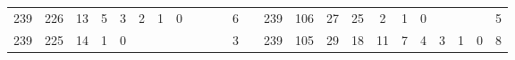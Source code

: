 {\begin{tabular}{cccccccccccclccccccccccc}
239                                                & 226                                                & 13                                               & 5                                                & 3                                                & 2                                                & 1                                               & 0                                               &                                                 &                                                 &                                                 & 6                                                &                          & 239                                                & 106                                                & 27                                               & 25                                               & 2                                               & 1                                               & 0                                               &                                                 &                                                 &                                                 & 5                                                \\
239                                                & 225                                                & 14                                               & 1                                                & 0                                                &                                                  &                                                 &                                                 &                                                 &                                                 &                                                 & 3                                                &                          & 239                                                & 105                                                & 29                                               & 18                                               & 11                                              & 7                                               & 4                                               & 3                                               & 1                                               & 0                                               & 8                                                \\

\end{tabular}}
